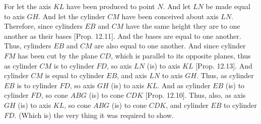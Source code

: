 \begin{Parallel}{}{}
{For let the axis $KL$ have been produced to point $N$. And let $LN$ be made equal to axis $GH$. 
And let the cylinder $CM$ have been conceived about axis $LN$. Therefore, since cylinders $EB$ and $CM$
have the same height they are to one another as their bases [Prop. 12.11]. And the bases are
equal to one another. Thus, cylinders $EB$ and $CM$ are also equal to one another. And since cylinder $FM$ has been cut
by the plane $CD$, which is parallel to its opposite planes, thus as cylinder $CM$ is to cylinder $FD$, so
axis $LN$ (is) to axis $KL$ [Prop. 12.13]. And cylinder $CM$ is equal to cylinder $EB$, and
axis $LN$ to axis $GH$.  Thus, as cylinder $EB$ is to cylinder $FD$, so axis $GH$ (is) to axis $KL$.  And as
cylinder $EB$ (is) to cylinder $FD$, so cone $ABG$ (is) to cone $CDK$ [Prop. 12.10].
Thus, also, as axis $GH$ (is) to axis $KL$, so cone $ABG$ (is) to cone $CDK$, and cylinder $EB$ to cylinder $FD$.
(Which is) the very thing it was required to show.}
\end{Parallel}

